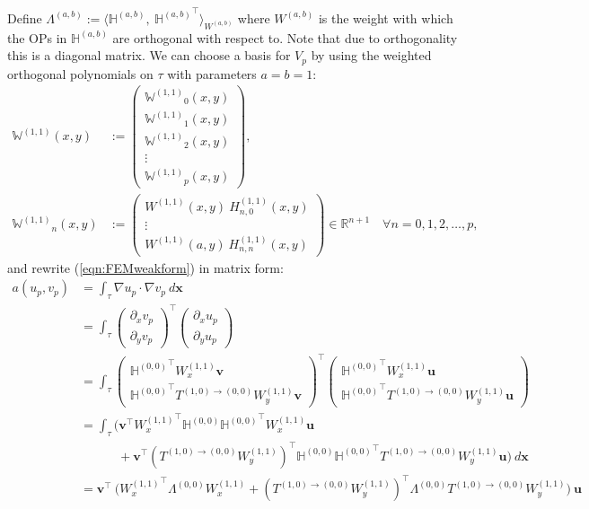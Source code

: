 \documentclass[11pt, oneside]{article}   	%
\newcommand{\R}{\mathbb{R}}
\newcommand{\hdop}{H}
\newcommand{\bighdop}{\mathbb{\hdop}}
\newcommand{\Wii}{W^{(1,1)}}
\newcommand{\hdopii}{\hdop^{(1,1)}}
\newcommand{\bighdopoo}{{\mathbb{\hdop}^{(0,0)}}}
\newcommand{\element}{\tau}
\newcommand{\bigWii}{{\mathbb{W}^{(1,1)}}}
\begin{document}
Define $\Lambda^{(a,b)} := \langle \bighdop^{(a,b)}, \: {\bighdop^{(a,b)}}^\top \rangle_{W^{(a,b)}}$ where $W^{(a,b)}$ is the weight with which the OPs in $\bighdop^{(a,b)}$ are orthogonal with respect to. Note that due to orthogonality this is a diagonal matrix. We can choose a basis for $V_p$ by using the weighted orthogonal polynomials on $\element$ with parameters $a = b = 1$:
\begin{align*}
\bigWii(x,y) &:= \begin{pmatrix}
		\bigWii_0(x,y) \\
		\bigWii_1(x,y) \\
		\bigWii_2(x,y) \\
		\vdots \\
		\bigWii_p(x,y)
	\end{pmatrix}, \\
\bigWii_n(x,y) &:= \begin{pmatrix}
		\Wii(x,y) \: \hdopii_{n,0}(x,y) \\
		\vdots \\
		\Wii(a,y) \: \hdopii_{n,n}(x,y)
	\end{pmatrix} \in \R^{n+1} \quad \forall n = 0,1,2,\dots,p,
\end{align*}
and rewrite (\ref{eqn:FEMweakform}) in matrix form:
\begin{align*}
	a(u_p,v_p) &= \int_\element \nabla u_p \cdot \nabla v_p \: d\mathbf{x} \\
	&= \int_\element \begin{pmatrix}
					\partial_x v_p \\
					\partial_y v_p
				\end{pmatrix}^\top 
				\begin{pmatrix}
					\partial_x u_p \\
					\partial_y u_p
				\end{pmatrix}
				\\
	&= \int_\element \begin{pmatrix}
					\bighdopoo^\top \Wii_x \mathbf{v} \\
					\bighdopoo^\top T^{(1,0)\to(0,0)} \Wii_y \mathbf{v}
				\end{pmatrix}^\top 
				\begin{pmatrix}
					\bighdopoo^\top \Wii_x \mathbf{u} \\
					\bighdopoo^\top T^{(1,0)\to(0,0)} \Wii_y \mathbf{u}
				\end{pmatrix}
				\\
	&= \int_\element \Big( \mathbf{v}^\top {\Wii_x}^\top \bighdopoo \bighdopoo^\top \Wii_x \mathbf{u} \nonumber \\
					& \quad \quad \quad + \mathbf{v}^\top ({T^{(1,0)\to(0,0)} \Wii_y})^\top \bighdopoo \bighdopoo^\top T^{(1,0)\to(0,0)} \Wii_y \mathbf{u}  \Big) \: d\mathbf{x} \\
	&= \mathbf{v}^\top \: \Big( {\Wii_x}^\top \Lambda^{(0,0)} \Wii_x + ({T^{(1,0)\to(0,0)} \Wii_y})^\top \Lambda^{(0,0)} T^{(1,0)\to(0,0)} \Wii_y \Big) \: \mathbf{u}
\end{align*}
\end{document}
